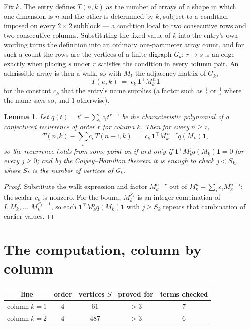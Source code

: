\documentclass[11pt,a4paper]{article}
\theoremstyle{plain}
\newtheorem{lemma}[theorem]{Lemma}
\theoremstyle{definition}
\begin{document}
Fix $k$. The entry defines $T(n,k)$ as the number of arrays of a shape in which one dimension
is $n$ and the other is determined by $k$, subject to a condition imposed on every
$2\times2$ subblock --- a condition local to two consecutive rows and two consecutive columns.
Substituting the fixed value of $k$ into the entry's own wording turns the definition into an
ordinary one-parameter array count, and for such a count the rows are the vertices of a finite
digraph $G_k$: $r\to s$ is an edge exactly when placing $s$ under $r$ satisfies the condition
in every column pair. An admissible array is then a walk, so with $M_k$ the adjacency matrix
of $G_k$,
\[
T(n,k)\;=\;c_k\,\mathbf{1}^{\!\top}M_k^{\,n}\mathbf{1}
\]
for the constant $c_k$ that the entry's name supplies (a factor such as $\tfrac12$ or
$\tfrac14$ where the name says so, and $1$ otherwise).

\begin{lemma}\label{lem:crit}
Let $q(t)=t^{r}-\sum_i c_it^{r-i}$ be the characteristic polynomial of a conjectured
recurrence of order $r$ for column $k$. Then for every $n\ge r$,
\[
T(n,k)-\sum_i c_i\,T(n-i,k)\;=\;c_k\,\mathbf{1}^{\!\top}M_k^{\,n-r}q(M_k)\mathbf{1},
\]
so the recurrence holds from some point on if and only if
$\mathbf{1}^{\!\top}M_k^{j}q(M_k)\mathbf{1}=0$ for every $j\ge0$; and by the
Cayley--Hamilton theorem it is enough to check $j<S_k$, where $S_k$ is the number of vertices
of $G_k$.
\end{lemma}

\begin{proof}
Substitute the walk expression and factor $M_k^{n-r}$ out of $M_k^{n}-\sum_ic_iM_k^{n-i}$;
the scalar $c_k$ is nonzero. For the bound, $M_k^{S_k}$ is an integer combination of
$I,M_k,\dots,M_k^{S_k-1}$, so each $\mathbf{1}^{\!\top}M_k^{j}q(M_k)\mathbf{1}$ with
$j\ge S_k$ repeats that combination of earlier values.
\end{proof}

\section{The computation, column by column}

\begin{center}
\begin{tabular}{ccccc}
line & order & vertices $S$ & proved for & terms checked \\ \hline
column $k$$=1$ & $4$ & $61$ & $>3$ & $7$ \\
column $k$$=2$ & $4$ & $487$ & $>3$ & $6$ \\
\end{tabular}
\end{center}
\end{document}
